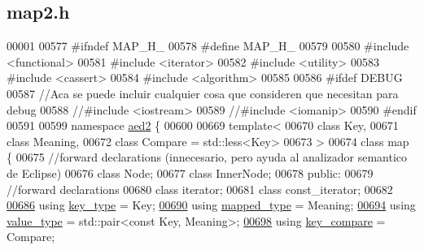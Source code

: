 \hypertarget{map2_8h_source}{}\subsection{map2.\+h}

\begin{DoxyCode}
00001 
00577 \textcolor{preprocessor}{#ifndef MAP\_H\_}
00578 \textcolor{preprocessor}{#define MAP\_H\_}
00579 
00580 \textcolor{preprocessor}{#include <functional>}
00581 \textcolor{preprocessor}{#include <iterator>}
00582 \textcolor{preprocessor}{#include <utility>}
00583 \textcolor{preprocessor}{#include <cassert>}
00584 \textcolor{preprocessor}{#include <algorithm>}
00585 
00586 \textcolor{preprocessor}{#ifdef DEBUG}
00587 \textcolor{comment}{//Aca se puede incluir cualquier cosa que consideren que necesitan para debug}
00588 \textcolor{comment}{//#include <iostream>}
00589 \textcolor{comment}{//#include <iomanip>}
00590 \textcolor{preprocessor}{#endif}
00591 
00599 \textcolor{keyword}{namespace }\hyperlink{namespaceaed2}{aed2} \{
00600 
00669 \textcolor{keyword}{template}<
00670   \textcolor{keyword}{class }Key,
00671   \textcolor{keyword}{class }Meaning,
00672   \textcolor{keyword}{class }Compare = std::less<Key>
00673 >
00674 \textcolor{keyword}{class }map \{
00675     \textcolor{comment}{//forward declarations (innecesario, pero ayuda al analizador semantico de Eclipse)}
00676     \textcolor{keyword}{class }Node;
00677     \textcolor{keyword}{class }InnerNode;
00678 \textcolor{keyword}{public}:
00679     \textcolor{comment}{//forward declarations}
00680     \textcolor{keyword}{class }iterator;
00681     \textcolor{keyword}{class }const\_iterator;
00682 
\hyperlink{classaed2_1_1map_a4273e8812e7105a618df58a2c8b72b7d_a4273e8812e7105a618df58a2c8b72b7d}{00686}     \textcolor{keyword}{using} \hyperlink{classaed2_1_1map_a4273e8812e7105a618df58a2c8b72b7d_a4273e8812e7105a618df58a2c8b72b7d}{key\_type} = Key;
\hyperlink{classaed2_1_1map_aa3e34bf624f3009884a71b18f4ddae40_aa3e34bf624f3009884a71b18f4ddae40}{00690}     \textcolor{keyword}{using} \hyperlink{classaed2_1_1map_aa3e34bf624f3009884a71b18f4ddae40_aa3e34bf624f3009884a71b18f4ddae40}{mapped\_type} = Meaning;
\hyperlink{classaed2_1_1map_a719db98e0ff9a837610f76be33264680_a719db98e0ff9a837610f76be33264680}{00694}     \textcolor{keyword}{using} \hyperlink{classaed2_1_1map_a719db98e0ff9a837610f76be33264680_a719db98e0ff9a837610f76be33264680}{value\_type} = std::pair<const Key, Meaning>;
\hyperlink{classaed2_1_1map_a3efa081d3379ab76f33a5ef9fe697523_a3efa081d3379ab76f33a5ef9fe697523}{00698}     \textcolor{keyword}{using} \hyperlink{classaed2_1_1map_a3efa081d3379ab76f33a5ef9fe697523_a3efa081d3379ab76f33a5ef9fe697523}{key\_compare} = Compare;

\end{DoxyCode}
